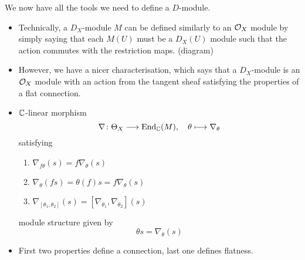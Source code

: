\documentclass[a4paper]{article}
\begin{document}
We now have all the tools we need to define a $D$-module.
\begin{itemize}
    \item Technically, a $D_X$-module $M$ can be defined similarly to an $\mathcal{O}_X$ module by simply saying that each $M(U)$ must be a $D_X(U)$ module such that the action commutes with the restriction maps. (diagram)
    \item However, we have a nicer characterisation, which says that a $D_X$-module is an $\mathcal{O}_X$ module with an action from the tangent sheaf satisfying the properties of a flat connection.
    \item $\mathbb{C}$-linear morphism 
        \[
            \nabla\colon\Theta_X\longrightarrow \operatorname{End}_{\mathbb{C}}(M),\quad\theta\longmapsto \nabla_\theta
        \]
        satisfying
        \begin{enumerate}
            \item $\nabla_{f\theta}(s) = f\nabla_{\theta}(s)$ \\
            \item $\nabla_\theta(fs) = \theta(f)s = f\nabla_\theta(s)$ \\
            \item $\nabla_{[\theta_1, \theta_2]}(s) = [\nabla_{\theta_1}, \nabla_{\theta_2}](s)$
        \end{enumerate}
        module structure given by
        \[
            \theta s = \nabla_\theta(s)
        \]
    \item First two properties define a connection, last one defines flatness.
\end{itemize}
\end{document}
